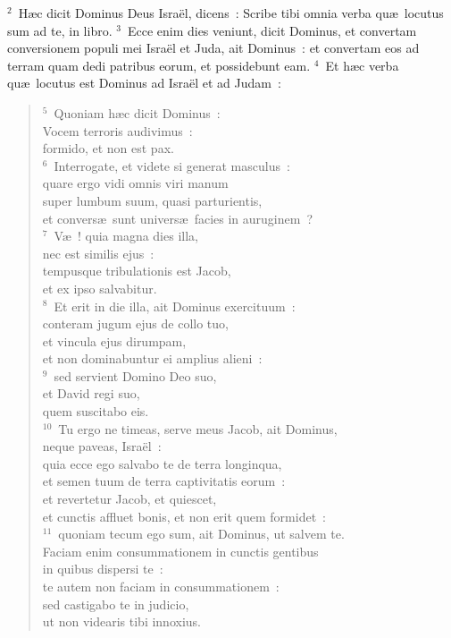 ${}^{2}$~H\ae c dicit Dominus Deus Isra\"el, dicens~: Scribe tibi omnia verba qu\ae\ locutus sum ad te, in libro.
${}^{3}$~Ecce enim dies veniunt, dicit Dominus, et convertam conversionem populi mei Isra\"el et Juda, ait Dominus~: et convertam eos ad terram quam dedi patribus eorum, et possidebunt eam.
${}^{4}$~Et h\ae c verba qu\ae\ locutus est Dominus ad Isra\"el et ad Judam~:
\begin{flushleft}\begin{verse}${}^{5}$~Quoniam h\ae c dicit Dominus~:\\ Vocem terroris audivimus~:\\ formido, et non est pax.\\
${}^{6}$~Interrogate, et videte si generat masculus~:\\ quare ergo vidi omnis viri manum\\ super lumbum suum, quasi parturientis,\\ et convers\ae\ sunt univers\ae\ facies in auruginem~?\\
${}^{7}$~V\ae~! quia magna dies illa,\\ nec est similis ejus~:\\ tempusque tribulationis est Jacob,\\ et ex ipso salvabitur.\\
${}^{8}$~Et erit in die illa, ait Dominus exercituum~:\\ conteram jugum ejus de collo tuo,\\ et vincula ejus dirumpam,\\ et non dominabuntur ei amplius alieni~:\\
${}^{9}$~sed servient Domino Deo suo,\\ et David regi suo,\\ quem suscitabo eis.\\
${}^{10}$~Tu ergo ne timeas, serve meus Jacob, ait Dominus,\\ neque paveas, Isra\"el~:\\ quia ecce ego salvabo te de terra longinqua,\\ et semen tuum de terra captivitatis eorum~:\\ et revertetur Jacob, et quiescet,\\ et cunctis affluet bonis, et non erit quem formidet~:\\
${}^{11}$~quoniam tecum ego sum, ait Dominus, ut salvem te.\\ Faciam enim consummationem in cunctis gentibus\\ in quibus dispersi te~:\\ te autem non faciam in consummationem~:\\ sed castigabo te in judicio,\\ ut non videaris tibi innoxius.\\

\end{verse}
\end{flushleft}

